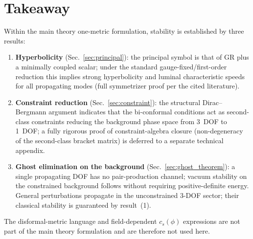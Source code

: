 \documentclass[11pt]{article}
\begin{document}
\section{Takeaway}\label{sec:take}
Within the main theory one-metric formulation, stability is established by three results:
\begin{enumerate}
\item \textbf{Hyperbolicity} (Sec.~\ref{sec:principal}): the principal symbol is that of GR plus a minimally coupled scalar; under the standard gauge-fixed/first-order reduction this implies strong hyperbolicity and luminal characteristic speeds for all propagating modes (full symmetrizer proof per the cited literature).
\item \textbf{Constraint reduction} (Sec.~\ref{sec:constraint}): the structural Dirac--Bergmann argument indicates that the bi-conformal conditions act as second-class constraints reducing the background phase space from 3~DOF to 1~DOF; a fully rigorous proof of constraint-algebra closure (non-degeneracy of the second-class bracket matrix) is deferred to a separate technical appendix.
\item \textbf{Ghost elimination on the background} (Sec.~\ref{sec:ghost_theorem}): a single propagating DOF has no pair-production channel; vacuum stability on the constrained background follows without requiring positive-definite energy.  General perturbations propagate in the unconstrained 3-DOF sector; their classical stability is guaranteed by result~(1).
\end{enumerate}
The disformal-metric language and field-dependent $c_s(\phi)$ expressions are not part of the main theory formulation and are therefore not used here.
\end{document}

